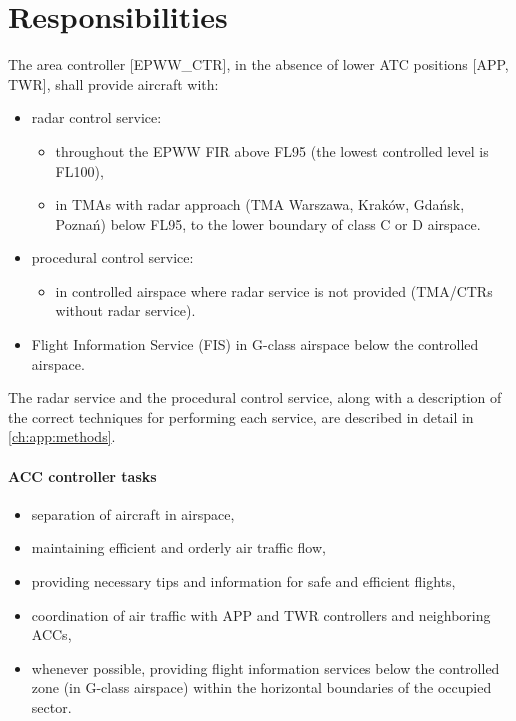 
\chapter{Responsibilities}
\label{chap:acc:responsibilities}

The area controller [EPWW\_CTR], in the absence of lower ATC positions [APP,
TWR], shall provide aircraft with:

\begin{itemize}
\item radar control service:
  \begin{itemize}
  \item throughout the EPWW FIR above FL95 (the lowest controlled level is
    FL100),
  \item in TMAs with radar approach (TMA Warszawa, Kraków, Gdańsk, Poznań) below
    FL95, to the lower boundary of class C or D airspace.
  \end{itemize}
\item procedural control service:
  \begin{itemize}
  \item in controlled airspace where radar service is not provided (TMA/CTRs
    without radar service).
  \end{itemize}
\item Flight Information Service (FIS) in G-class airspace below the controlled airspace.
\end{itemize}

The radar service and the procedural control service, along with a description
of the correct techniques for performing each service, are described in detail
in \cref{ch:app:methods}.

\subsubsection{ACC controller tasks}

\begin{itemize}
\item separation of aircraft in airspace,
\item maintaining efficient and orderly air traffic flow,
\item providing necessary tips and information for safe and efficient flights,
\item coordination of air traffic with APP and TWR controllers and neighboring ACCs,
\item whenever possible, providing flight information services below the controlled zone (in G-class airspace) within the horizontal boundaries of the occupied sector.
\end{itemize}
